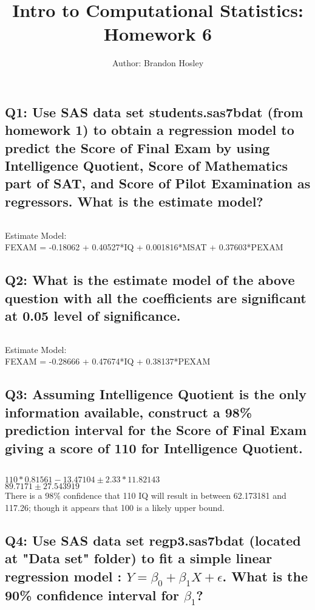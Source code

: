\documentclass[a4paper,man,natbib]{apa6}
\title{Intro to Computational Statistics: Homework 6}
\author{Author: Brandon Hosley}
\affiliation{Instructor: Liang Kong, Ph.D}
\begin{document}
\maketitle
\singlespacing
	
\subsection*{Q1: Use SAS data set students.sas7bdat (from homework 1) to obtain a regression model to predict the Score of Final Exam by using Intelligence Quotient, Score of Mathematics part of SAT, and Score of Pilot Examination as regressors. What is the estimate model? }
\inputminted[breaklines,bgcolor=light-gray]{sas}{./Snippets/DAT502-HW6-1.sas}
Estimate Model: \\
FEXAM = -0.18062 + 0.40527*IQ + 0.001816*MSAT + 0.37603*PEXAM



\subsection*{Q2: What is the estimate model of the above question with all the coefficients are significant at 0.05 level of significance. }
\inputminted[breaklines,bgcolor=light-gray]{sas}{./Snippets/DAT502-HW6-2.sas}
Estimate Model: \\
FEXAM = -0.28666 + 0.47674*IQ + 0.38137*PEXAM



\subsection*{Q3: Assuming Intelligence Quotient is the only information available, construct a 98\% prediction interval for the Score of Final Exam giving a score of 110 for Intelligence Quotient. }
\inputminted[breaklines,bgcolor=light-gray]{sas}{./Snippets/DAT502-HW6-3.sas}

$ 110 * 0.81561 - 13.47104 \pm 2.33 * 11.82143 $ \\
$ 89.7171 \pm 27.543919 $ \\
There is a 98\% confidence that 110 IQ will result in between 62.173181 and 117.26; though it appears that 100 is a likely upper bound.



\subsection*{Q4: Use SAS data set regp3.sas7bdat (located at "Data set" folder) to fit a simple linear regression model : $Y = \beta_0 + \beta_1X + \epsilon$. What is the 90\% confidence interval for $\beta_1$?
 }
\inputminted[breaklines,bgcolor=light-gray]{sas}{./Snippets/DAT502-HW6-4.sas}
\end{document}
